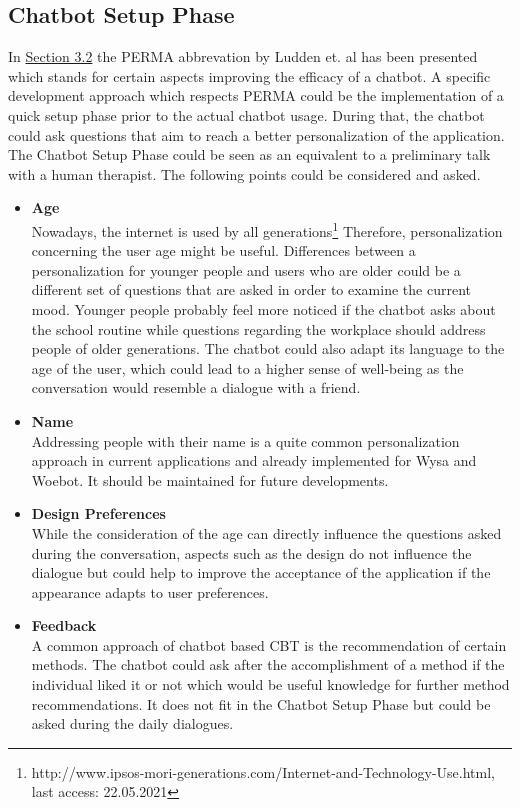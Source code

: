 \documentclass[sigconf, nonacm]{acmart}
\begin{document}
\subsection{Chatbot Setup Phase}
\label{sec:four_two}
In \hyperref[sec:three_two]{Section 3.2} the PERMA abbrevation by Ludden et. al \cite{Ludden2015} has been presented which stands for certain aspects improving the efficacy of a chatbot. A specific development approach which respects PERMA could be the implementation of a quick setup phase prior to the actual chatbot usage.
During that, the chatbot could ask questions that aim to reach a better personalization of the application. The Chatbot Setup Phase could be seen as an equivalent to a preliminary talk with a human therapist. The following points could be considered and asked.
\\
\begin{itemize}
\item\textbf{Age}\\ 
Nowadays, the internet is used by all generations\footnote{http://www.ipsos-mori-generations.com/Internet-and-Technology-Use.html, last access: 22.05.2021}
Therefore, personalization concerning the user age might be useful. Differences between a personalization for younger people and users who are older could be a different set of questions that are asked in order to examine the current mood.
Younger people probably feel more noticed if the chatbot asks about the school routine while questions regarding the workplace should address people of older generations.
The chatbot could also adapt its language to the age of the user, which could lead to a higher sense of well-being as the conversation would resemble a dialogue with a friend. 
\\
\item\textbf{Name}\\
Addressing people with their name is a quite common personalization approach in current applications and already implemented for Wysa and Woebot. It should be maintained for future developments.
\\
\item\textbf{Design Preferences}\\
While the consideration of the age can directly influence the questions asked during the conversation, aspects such as the design do not influence the dialogue but could help to improve the acceptance of the application if the appearance adapts to user preferences. 
\\
\item\textbf{Feedback}\\
A common approach of chatbot based CBT is the recommendation of certain methods. The chatbot could ask after the accomplishment of a method if the individual liked it or not which would be useful knowledge for further method recommendations. It does not fit in the Chatbot Setup Phase but could
be asked during the daily dialogues.
\\
\end{itemize} 
\end{document}
